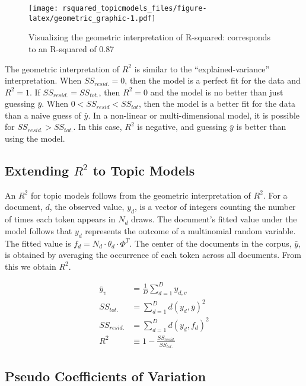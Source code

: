 \documentclass[conference,final,]{IEEEtran}
\makeatletter
\def\maxwidth{\ifdim\Gin@nat@width>\linewidth\linewidth
\else\Gin@nat@width\fi}
\let\Oldincludegraphics\includegraphics
\renewcommand{\includegraphics}[1]{\Oldincludegraphics[width=\maxwidth]{#1}}
\makeatother
\begin{document}
\begin{figure}
\centering
\texttt{[image: rsquared\_topicmodels\_files/figure-latex/geometric\_graphic-1.pdf]}
\caption{Visualizing the geometric interpretation of R-squared:
corresponds to an R-squared of 0.87}
\end{figure}

The geometric interpretation of \(R^2\) is similar to the
``explained-variance'' interpretation. When \(SS_{resid.} = 0\), then
the model is a perfect fit for the data and \(R^2 = 1\). If
\(SS_{resid.} = SS_{tot.}\), then \(R^2 = 0\) and the model is no better
than just guessing \(\bar{y}\). When \(0 < SS_{resid} < SS_{tot}\), then
the model is a better fit for the data than a naive guess of
\(\bar{y}\). In a non-linear or multi-dimensional model, it is possible
for \(SS_{resid.} > SS_{tot.}\). In this case, \(R^2\) is negative, and
guessing \(\bar{y}\) is better than using the model.

\hypertarget{extending-r2-to-topic-models}{%
\subsection{\texorpdfstring{Extending \(R^2\) to Topic
Models}{Extending R\^{}2 to Topic Models}}\label{extending-r2-to-topic-models}}

An \(R^2\) for topic models follows from the geometric interpretation of
\(R^2\). For a document, \(d\), the observed value, \(y_d\), is a vector
of integers counting the number of times each token appears in \(N_d\)
draws. The document's fitted value under the model follows that \(y_d\)
represents the outcome of a multinomial random variable. The fitted
value is \(f_d = N_d \cdot \theta_d \cdot \Phi^T\). The center of the
documents in the corpus, \(\bar{y}\), is obtained by averaging the
occurrence of each token across all documents. From this we obtain
\(R^2\).

\begin{align}
    \bar{y}_v &= \frac{1}{D}\sum_{d=1}^{D}y_{d,v}\\
    SS_{tot.} &= \sum_{d=1}^D{d(y_d, \bar{y})^2}\\
    SS_{resid.} &= \sum_{d=1}^D{d(y_d, f_d)^2}\\
    R^2 &\equiv 1 - \frac{SS_{resid.}}{SS_{tot.} }
\end{align}

\hypertarget{pseudo-coefficients-of-variation}{%
\subsection{Pseudo Coefficients of
Variation}\label{pseudo-coefficients-of-variation}}
\end{document}
